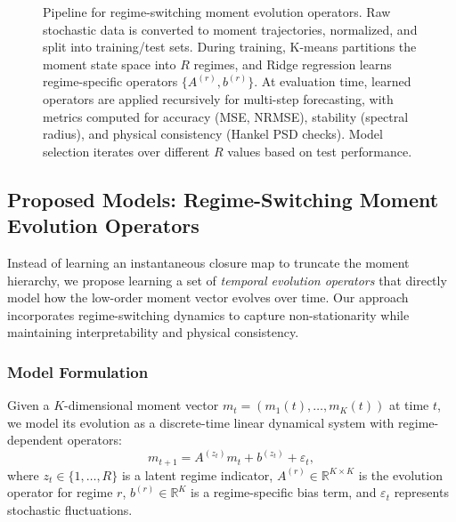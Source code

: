 \documentclass[journal, onecolumn]{IEEEtran}
\begin{document}
\begin{figure}[t]
\caption{Pipeline for regime-switching moment evolution operators. Raw stochastic data is converted to moment trajectories, normalized, and split into training/test sets. During training, K-means partitions the moment state space into $R$ regimes, and Ridge regression learns regime-specific operators $\{A^{(r)}, b^{(r)}\}$. At evaluation time, learned operators are applied recursively for multi-step forecasting, with metrics computed for accuracy (MSE, NRMSE), stability (spectral radius), and physical consistency (Hankel PSD checks). Model selection iterates over different $R$ values based on test performance.}
\label{fig:pipeline}
\end{figure}

\subsection{Proposed Models: Regime-Switching Moment Evolution Operators}

Instead of learning an instantaneous closure map to truncate the moment hierarchy, we propose learning a set of \emph{temporal evolution operators} that directly model how the low-order moment vector evolves over time. Our approach incorporates regime-switching dynamics to capture non-stationarity while maintaining interpretability and physical consistency.

\subsubsection{Model Formulation}

Given a $K$-dimensional moment vector $m_t = (m_1(t), \dots, m_K(t))$ at time $t$, we model its evolution as a discrete-time linear dynamical system with regime-dependent operators:
\begin{equation}
m_{t+1} = A^{(z_t)} m_t + b^{(z_t)} + \varepsilon_t,
\label{eq:regime_dynamics}
\end{equation}
where $z_t \in \{1, \dots, R\}$ is a latent regime indicator, $A^{(r)} \in \mathbb{R}^{K \times K}$ is the evolution operator for regime $r$, $b^{(r)} \in \mathbb{R}^K$ is a regime-specific bias term, and $\varepsilon_t$ represents stochastic fluctuations.
\end{document}
